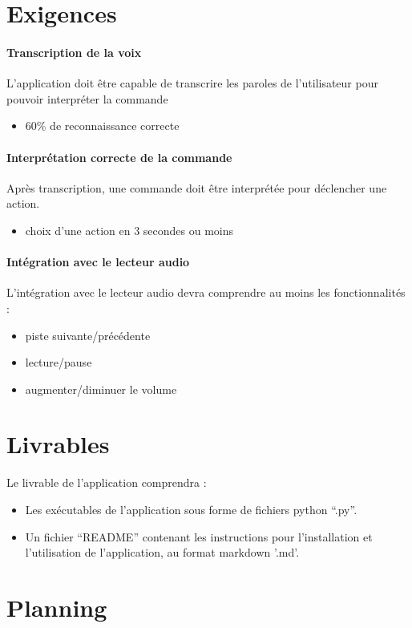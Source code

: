 \documentclass[12pt]{article}
\begin{document}
    \section{Exigences}

\paragraph{Transcription de la voix\\}
L'application doit être capable de transcrire
les paroles de l'utilisateur pour pouvoir interpréter la
commande
\begin{itemize}
    \item 60\% de reconnaissance correcte
\end{itemize}

\paragraph{Interprétation correcte de la commande\\}
Après transcription, une commande doit être interprétée pour déclencher une
action.
\begin{itemize}
    \item choix d'une action en 3 secondes ou moins
\end{itemize}

\paragraph{Intégration avec le lecteur audio\\}
L'intégration avec le lecteur audio devra comprendre au moins les
fonctionnalités :
\begin{itemize}
    \item piste suivante/précédente
    \item lecture/pause
    \item augmenter/diminuer le volume
\end{itemize}

    \section{Livrables}

    Le livrable de l'application comprendra :

    \begin{itemize}
        \item Les exécutables de l'application sous forme de fichiers python
            ``.py''.
        \item Un fichier ``README'' contenant les instructions pour
            l'installation et l'utilisation de l'application, au format
            markdown '.md'.
    \end{itemize}

    \section{Planning}
\end{document}
